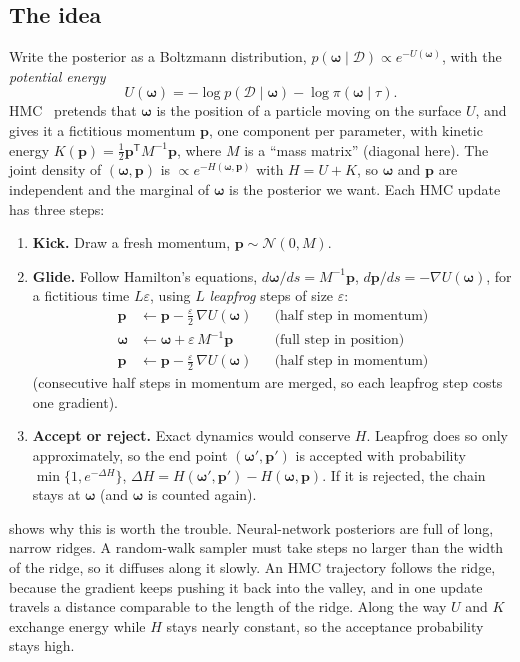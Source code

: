 \documentclass[11pt]{article}
\newcommand{\bw}{\boldsymbol{\omega}}
\newcommand{\bp}{\boldsymbol{p}}
\newcommand{\data}{\mathcal{D}}
\begin{document}
\subsection{The idea}

Write the posterior as a Boltzmann distribution, $p(\bw \mid \data) \propto
e^{-U(\bw)}$, with the \emph{potential energy}
\begin{equation}
  U(\bw) = -\log p(\data \mid \bw) - \log \pi(\bw \mid \tau).
\end{equation}
HMC~\cite{duane1987,neal2011} pretends that $\bw$ is the position of a particle
moving on the surface $U$, and gives it a fictitious momentum $\bp$, one component
per parameter, with kinetic energy $K(\bp) = \tfrac12 \bp^{\mathsf T} M^{-1} \bp$,
where $M$ is a ``mass matrix'' (diagonal here). The joint density of $(\bw, \bp)$ is
$\propto e^{-H(\bw, \bp)}$ with $H = U + K$, so $\bw$ and $\bp$ are independent and
the marginal of $\bw$ is the posterior we want. Each HMC update has three steps:

\begin{enumerate}
  \item \textbf{Kick.} Draw a fresh momentum, $\bp \sim \mathcal{N}(0, M)$.
  \item \textbf{Glide.} Follow Hamilton's equations, $d\bw/ds = M^{-1}\bp$,
    $d\bp/ds = -\nabla U(\bw)$, for a fictitious time $L\varepsilon$, using $L$
    \emph{leapfrog} steps of size $\varepsilon$:
    \begin{align*}
      \bp &\leftarrow \bp - \tfrac{\varepsilon}{2}\, \nabla U(\bw) && \text{(half step in momentum)}\\
      \bw &\leftarrow \bw + \varepsilon\, M^{-1}\bp && \text{(full step in position)}\\
      \bp &\leftarrow \bp - \tfrac{\varepsilon}{2}\, \nabla U(\bw) && \text{(half step in momentum)}
    \end{align*}
    (consecutive half steps in momentum are merged, so each leapfrog step costs one
    gradient).
  \item \textbf{Accept or reject.} Exact dynamics would conserve $H$. Leapfrog does
    so only approximately, so the end point $(\bw', \bp')$ is accepted with
    probability $\min\{1, e^{-\Delta H}\}$, $\Delta H = H(\bw', \bp') - H(\bw, \bp)$.
    If it is rejected, the chain stays at $\bw$ (and $\bw$ is counted again).
\end{enumerate}

\noindent {} shows why this is worth the trouble. Neural-network
posteriors are full of long, narrow ridges. A random-walk sampler must take steps
no larger than the width of the ridge, so it diffuses along it slowly. An HMC
trajectory follows the ridge, because the gradient keeps pushing it back into the
valley, and in one update travels a distance comparable to the length of the ridge.
Along the way $U$ and $K$ exchange energy while $H$ stays nearly constant, so the
acceptance probability stays high.
\end{document}
